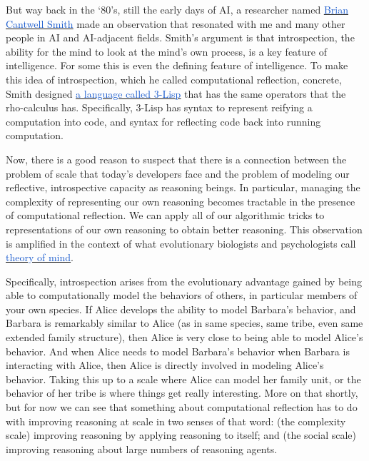 \vspace{1\baselineskip}
But way back in the ‘80’s, still the early days of AI, a researcher named \href{https://en.wikipedia.org/wiki/Brian_Cantwell_Smith#:~:text=Brian\%20Cantwell\%20Smith\%20is\%20a,\%2C\%20and\%20philosophy\%2C\%20especially\%20ontology.}{\uline{\textcolor[HTML]{1155CC}{Brian Cantwell Smith}}} made an observation that resonated with me and many other people in AI and AI-adjacent fields. Smith’s argument is that introspection, the ability for the mind to look at the mind’s own process, is a key feature of intelligence. For some this is even the defining feature of intelligence. To make this idea of introspection, which he called computational reflection, concrete, Smith designed \href{https://www.ics.uci.edu/~jajones/INF102-S18/readings/17_Smith84.pdf}{\uline{\textcolor[HTML]{1155CC}{a language called 3-Lisp}}} that has the same operators that the rho-calculus has. Specifically, 3-Lisp has syntax to represent reifying a computation into code, and syntax for reflecting code back into running computation.

\vspace{1\baselineskip}
Now, there is a good reason to suspect that there is a connection between the problem of scale that today’s developers face and the problem of modeling our reflective, introspective capacity as reasoning beings. In particular, managing the complexity of representing our own reasoning becomes tractable in the presence of computational reflection. We can apply all of our algorithmic tricks to representations of our own reasoning to obtain better reasoning. This observation is amplified in the context of what evolutionary biologists and psychologists call \href{https://en.wikipedia.org/wiki/Theory_of_mind}{\uline{\textcolor[HTML]{1155CC}{theory of mind}}}. 

\vspace{1\baselineskip}
Specifically, introspection arises from the evolutionary advantage gained by being able to computationally model the behaviors of others, in particular members of your own species. If Alice develops the ability to model Barbara’s behavior, and Barbara is remarkably similar to Alice (as in same species, same tribe, even same extended family structure), then Alice is very close to being able to model Alice’s behavior. And when Alice needs to model Barbara’s behavior when Barbara is interacting with Alice, then Alice is directly involved in modeling Alice’s behavior. Taking this up to a scale where Alice can model her family unit, or the behavior of her tribe is where things get really interesting. More on that shortly, but for now we can see that something about computational reflection has to do with improving reasoning at scale in two senses of that word: (the complexity scale) improving reasoning by applying reasoning to itself; and (the social scale) improving reasoning about large numbers of reasoning agents.

